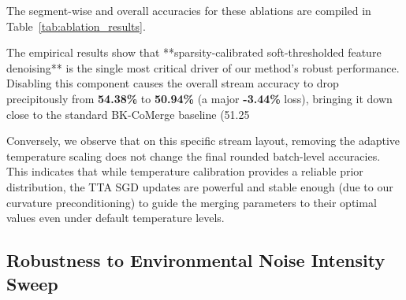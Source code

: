 \documentclass{article}
\theoremstyle{plain}
\theoremstyle{definition}
\theoremstyle{remark}
\begin{document}
The segment-wise and overall accuracies for these ablations are compiled in Table~\ref{tab:ablation_results}.

\begin{table}[t]
\centering
\caption{Ablation study segment-wise and overall accuracy (\%) on Standard CNN experts.}
\label{tab:ablation_results}
\end{table}

The empirical results show that **sparsity-calibrated soft-thresholded feature denoising** is the single most critical driver of our method's robust performance. Disabling this component causes the overall stream accuracy to drop precipitously from \textbf{54.38\%} to \textbf{50.94\%} (a major \textbf{-3.44\%} loss), bringing it down close to the standard BK-CoMerge baseline (51.25%

Conversely, we observe that on this specific stream layout, removing the adaptive temperature scaling does not change the final rounded batch-level accuracies. This indicates that while temperature calibration provides a reliable prior distribution, the TTA SGD updates are powerful and stable enough (due to our curvature preconditioning) to guide the merging parameters to their optimal values even under default temperature levels.

\subsection{Robustness to Environmental Noise Intensity Sweep}
\label{sec:noise_sweep}
\end{document}
